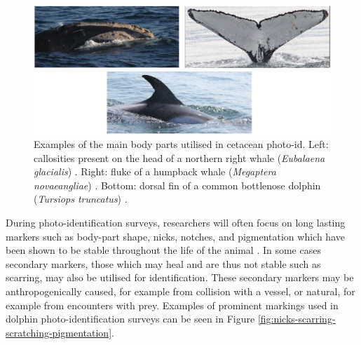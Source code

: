 \begin{figure}
	\begin{center}
		\includegraphics[scale=0.6]{Chapter2/figs/body-part-examples.png}
	\end{center}
	\caption{Examples of the main body parts utilised in cetacean photo-id. Left: callosities present on the head of a northern right whale (\textit{Eubalaena glacialis}) \cite{perrin_encyclopedia_2009}. Right: fluke of a humpback whale (\textit{Megaptera novaeangliae}) \cite{cheeseman_happywhale_2019}. Bottom: dorsal fin of a common bottlenose dolphin (\textit{Tursiops truncatus}) \cite{trotter_ndd20_2020}.
	}
	\label{fig:body-parts}
\end{figure}

During photo-identification surveys, researchers will often focus on long lasting markers such as body-part shape, nicks, notches, and pigmentation which have been shown to be stable throughout the life of the animal \cite{wursig_photographic_1977, lockyer_observations_1990, mann_cetacean_2000}. In some cases secondary markers, those which may heal and are thus not stable such as scarring, may also be utilised for identification. These secondary markers may be anthropogenically caused, for example from collision with a vessel, or natural, for example from encounters with prey. Examples of prominent markings used in dolphin photo-identification surveys can be seen in Figure \ref{fig:nicks-scarring-scratching-pigmentation}.

